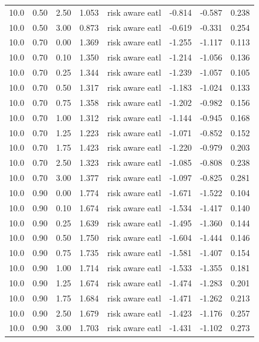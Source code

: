 \begin{longtable}{rrrrlrrr}
10.0 & 0.50 & 2.50 & 1.053 & risk aware eatl & -0.814 & -0.587 & 0.238 \\
10.0 & 0.50 & 3.00 & 0.873 & risk aware eatl & -0.619 & -0.331 & 0.254 \\
10.0 & 0.70 & 0.00 & 1.369 & risk aware eatl & -1.255 & -1.117 & 0.113 \\
10.0 & 0.70 & 0.10 & 1.350 & risk aware eatl & -1.214 & -1.056 & 0.136 \\
10.0 & 0.70 & 0.25 & 1.344 & risk aware eatl & -1.239 & -1.057 & 0.105 \\
10.0 & 0.70 & 0.50 & 1.317 & risk aware eatl & -1.183 & -1.024 & 0.133 \\
10.0 & 0.70 & 0.75 & 1.358 & risk aware eatl & -1.202 & -0.982 & 0.156 \\
10.0 & 0.70 & 1.00 & 1.312 & risk aware eatl & -1.144 & -0.945 & 0.168 \\
10.0 & 0.70 & 1.25 & 1.223 & risk aware eatl & -1.071 & -0.852 & 0.152 \\
10.0 & 0.70 & 1.75 & 1.423 & risk aware eatl & -1.220 & -0.979 & 0.203 \\
10.0 & 0.70 & 2.50 & 1.323 & risk aware eatl & -1.085 & -0.808 & 0.238 \\
10.0 & 0.70 & 3.00 & 1.377 & risk aware eatl & -1.097 & -0.825 & 0.281 \\
10.0 & 0.90 & 0.00 & 1.774 & risk aware eatl & -1.671 & -1.522 & 0.104 \\
10.0 & 0.90 & 0.10 & 1.674 & risk aware eatl & -1.534 & -1.417 & 0.140 \\
10.0 & 0.90 & 0.25 & 1.639 & risk aware eatl & -1.495 & -1.360 & 0.144 \\
10.0 & 0.90 & 0.50 & 1.750 & risk aware eatl & -1.604 & -1.444 & 0.146 \\
10.0 & 0.90 & 0.75 & 1.735 & risk aware eatl & -1.581 & -1.407 & 0.154 \\
10.0 & 0.90 & 1.00 & 1.714 & risk aware eatl & -1.533 & -1.355 & 0.181 \\
10.0 & 0.90 & 1.25 & 1.674 & risk aware eatl & -1.474 & -1.283 & 0.201 \\
10.0 & 0.90 & 1.75 & 1.684 & risk aware eatl & -1.471 & -1.262 & 0.213 \\
10.0 & 0.90 & 2.50 & 1.679 & risk aware eatl & -1.423 & -1.176 & 0.257 \\
10.0 & 0.90 & 3.00 & 1.703 & risk aware eatl & -1.431 & -1.102 & 0.273 \\
\bottomrule
\end{longtable}
